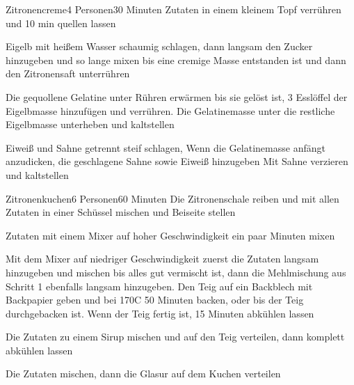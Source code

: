 \documentclass{book}
\begin{document}
\begin{recipe}{Zitronencreme}{4 Personen}{30 Minuten}
Zutaten in einem kleinem Topf verrühren und 10 min quellen lassen

Eigelb mit heißem Wasser schaumig schlagen, dann langsam den Zucker hinzugeben und so lange mixen bis eine cremige Masse entstanden ist und dann den Zitronensaft unterrühren

\ing[]{}{}
Die gequollene Gelatine unter Rühren erwärmen bis sie gelöst ist, 3 Esslöffel der Eigelbmasse hinzufügen und verrühren. Die Gelatinemasse unter die restliche Eigelbmasse unterheben und kaltstellen

Eiweiß und Sahne getrennt steif schlagen,
Wenn die Gelatinemasse anfängt anzudicken, die geschlagene Sahne sowie Eiweiß hinzugeben
Mit Sahne verzieren und kaltstellen
\end{recipe}


\begin{recipe}{Zitronenkuchen}{6 Personen}{60 Minuten}
Die Zitronenschale reiben und mit allen Zutaten in einer Schüssel mischen und Beiseite stellen

Zutaten mit einem Mixer auf hoher Geschwindigkeit ein paar Minuten mixen

Mit dem Mixer auf niedriger Geschwindigkeit zuerst die Zutaten langsam hinzugeben und mischen bis alles gut vermischt ist, dann die Mehlmischung aus Schritt 1 ebenfalls langsam hinzugeben. Den Teig auf ein Backblech mit Backpapier geben und bei 170\0C 50 Minuten backen, oder bis der Teig durchgebacken ist. Wenn der Teig fertig ist, 15 Minuten abkühlen lassen

Die Zutaten zu einem Sirup mischen und auf den Teig verteilen, dann komplett abkühlen lassen

Die Zutaten mischen, dann die Glasur auf dem Kuchen verteilen
\end{recipe}

\end{document}
